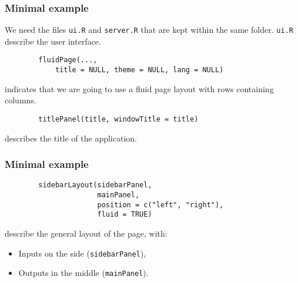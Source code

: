 \documentclass{beamer}
\begin{document}
	\begin{frame}[fragile]
		\frametitle{Minimal example}

		We need the files \verb|ui.R| and \verb|server.R| that are kept within the same folder. \verb|ui.R| describe the user interface.

		\vspace{2em}		

		\begin{exampleblock}{}
		\begin{BVerbatim}
		fluidPage(...,
		    title = NULL, theme = NULL, lang = NULL)
		\end{BVerbatim}
		\end{exampleblock}{}

		indicates that we are going to use a fluid page layout with rows containing columns.

		\vspace{2em}

		\begin{exampleblock}{}
		\begin{BVerbatim}
		titlePanel(title, windowTitle = title)
		\end{BVerbatim}
		\end{exampleblock}{}

		describes the title of the application.

	\end{frame}

	\begin{frame}[fragile]
		\frametitle{Minimal example}
		
		\begin{exampleblock}{}
		\begin{BVerbatim}
		sidebarLayout(sidebarPanel,
		              mainPanel,
		              position = c("left", "right"),
		              fluid = TRUE)
		\end{BVerbatim}
		\end{exampleblock}{}

		\vspace{2em}

		describe the general layout of the page, with:
		\begin{itemize}
			\item Inputs on the side (\verb|sidebarPanel|),
			\item Outputs in the middle (\verb|mainPanel|).
		\end{itemize}
	
	\end{frame}
\end{document}
